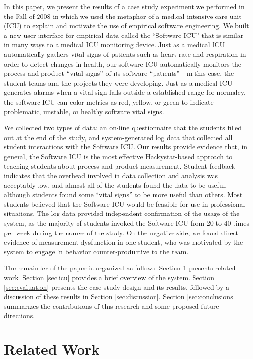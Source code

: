 \documentclass{acm_proc_article-sp}
\begin{document}
In this paper, we present the results of a case study experiment we
performed in the Fall of 2008 in which we used the metaphor of a medical
intensive care unit (ICU) to explain and motivate the use of empirical
software engineering.  We built a new user interface for empirical data called
the ``Software ICU'' that is similar in many ways to a medical ICU
monitoring device.  Just as a medical ICU automatically gathers vital signs
of patients such as heart rate and respiration in order to detect changes
in health, our software ICU automatically monitors the process and product
``vital signs'' of its software ``patients''---in this case, the student
teams and the projects they were developing.  Just as a medical ICU
generates alarms when a vital sign falls outside a established range for
normalcy, the software ICU can color metrics as red, yellow, or green to
indicate problematic, unstable, or healthy software vital signs.

We collected two types of data: an on-line questionnaire that the students
filled out at the end of the study, and system-generated log data that
collected all student interactions with the Software ICU.  Our results
provide evidence that, in general, the Software ICU is the most effective
Hackystat-based approach to teaching students about process and product
measurement.  Student feedback indicates that the overhead involved in data
collection and analysis was acceptably low, and almost all of the students
found the data to be useful, although students found some ``vital signs''
to be more useful than others. Most students believed that the Software ICU
would be feasible for use in professional situations.  The log data
provided independent confirmation of the usage of the system, as the
majority of students invoked the Software ICU from 20 to 40 times per week
during the course of the study.  On the negative side, we found direct
evidence of measurement dysfunction in one student, who was motivated by the
system to engage in behavior counter-productive to the team.

The remainder of the paper is organized as follows.  Section
\ref{sec:related} presents related work.  Section \ref{sec:icu} provides a
brief overview of the system. Section \ref{sec:evaluation} presents the
case study design and its results, followed by a discussion of these results
in Section \ref{sec:discussion}.   Section \ref{sec:conclusions} summarizes the 
contributions of this research and some proposed future directions.

\section {Related Work}
\label{sec:related}
\end{document}

